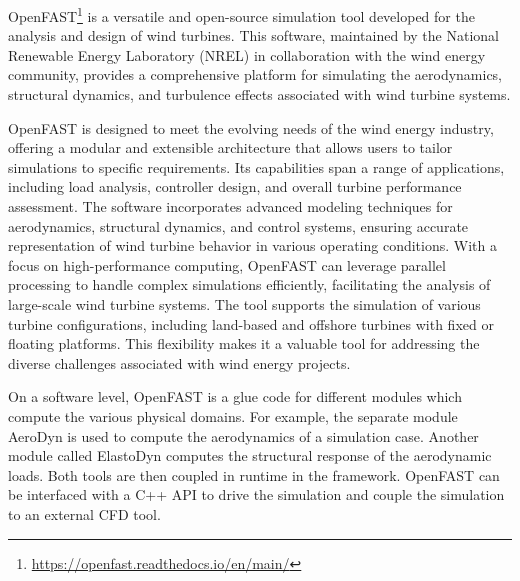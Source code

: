 OpenFAST\footnote{\url{https://openfast.readthedocs.io/en/main/}} is a versatile and open-source simulation tool developed for the analysis and design of wind turbines. This software, maintained by the National Renewable Energy Laboratory (NREL) in collaboration with the wind energy community, provides a comprehensive platform for simulating the aerodynamics, structural dynamics, and turbulence effects associated with wind turbine systems.

OpenFAST is designed to meet the evolving needs of the wind energy industry, offering a modular and extensible architecture that allows users to tailor simulations to specific requirements. Its capabilities span a range of applications, including load analysis, controller design, and overall turbine performance assessment. The software incorporates advanced modeling techniques for aerodynamics, structural dynamics, and control systems, ensuring accurate representation of wind turbine behavior in various operating conditions. With a focus on high-performance computing, OpenFAST can leverage parallel processing to handle complex simulations efficiently, facilitating the analysis of large-scale wind turbine systems. The tool supports the simulation of various turbine configurations, including land-based and offshore turbines with fixed or floating platforms. This flexibility makes it a valuable tool for addressing the diverse challenges associated with wind energy projects.

On a software level, OpenFAST is a glue code for different modules which compute the various physical domains. For example, the separate module AeroDyn is used to compute the aerodynamics of a simulation case. Another module called ElastoDyn computes the structural response of the aerodynamic loads. Both tools are then coupled in runtime in the framework. OpenFAST can be interfaced with a C++ API to drive the simulation and couple the simulation to an external CFD tool.

